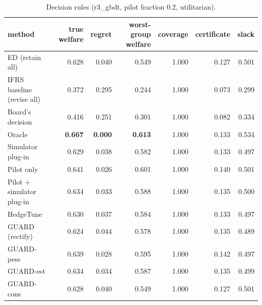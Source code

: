 \begin{table}[t]
\centering
\small
\begin{tabular}{lrrrrrr}
\toprule
method & true welfare & regret & worst-group welfare & coverage & certificate & slack \\
\midrule
ED (retain all) & 0.628 & 0.040 & 0.549 & 1.000 & 0.127 & 0.501 \\
IFRS baseline (revise all) & 0.372 & 0.295 & 0.244 & 1.000 & 0.073 & 0.299 \\
Board's decision & 0.416 & 0.251 & 0.301 & 1.000 & 0.082 & 0.334 \\
Oracle & \textbf{0.667} & \textbf{0.000} & \textbf{0.613} & 1.000 & 0.133 & 0.534 \\
Simulator plug-in & 0.629 & 0.038 & 0.582 & 1.000 & 0.133 & 0.497 \\
Pilot only & 0.641 & 0.026 & 0.601 & 1.000 & 0.140 & 0.501 \\
Pilot + simulator plug-in & 0.634 & 0.033 & 0.588 & 1.000 & 0.135 & 0.500 \\
HedgeTune & 0.630 & 0.037 & 0.584 & 1.000 & 0.133 & 0.497 \\
GUARD (rectify) & 0.624 & 0.044 & 0.578 & 1.000 & 0.135 & 0.489 \\
GUARD-pess & 0.639 & 0.028 & 0.595 & 1.000 & 0.142 & 0.497 \\
GUARD-est & 0.634 & 0.034 & 0.587 & 1.000 & 0.135 & 0.499 \\
GUARD-cons & 0.628 & 0.040 & 0.549 & 1.000 & 0.127 & 0.501 \\
\bottomrule
\end{tabular}
\caption{Decision rules (r3\_gbdt, pilot fraction 0.2, utilitarian).}
\label{tab:methods-utilitarian}
\end{table}
